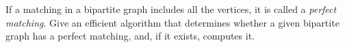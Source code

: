 If a matching in a bipartite graph includes all the vertices, it is
called a {\em perfect matching}.  Give an efficient algorithm that
determines whether a given bipartite graph has a perfect matching, and,
if it exists, computes it.

